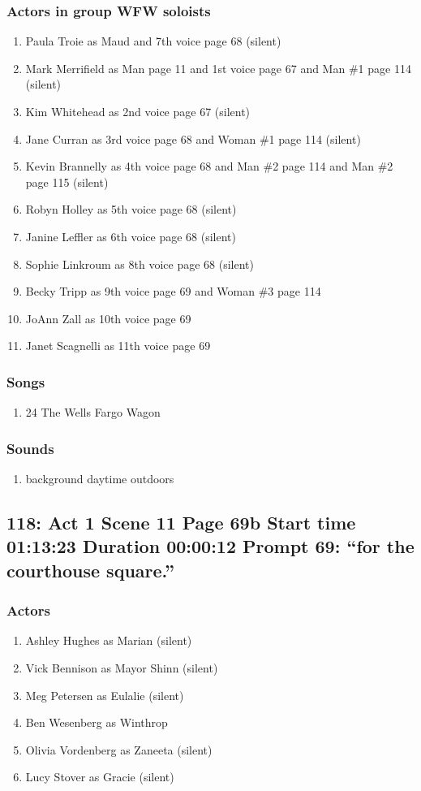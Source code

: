 \subsubsection{Actors in group WFW soloists}
\begin{enumerate}
\item Paula Troie as Maud and 7th voice page 68 (silent)
\item Mark Merrifield as Man page 11 and 1st voice page 67 and Man \#1 page 114 (silent)
\item Kim Whitehead as 2nd voice page 67 (silent)
\item Jane Curran as 3rd voice page 68 and Woman \#1 page 114 (silent)
\item Kevin Brannelly as 4th voice page 68 and Man \#2 page 114 and Man \#2 page 115 (silent)
\item Robyn Holley as 5th voice page 68 (silent)
\item Janine Leffler as 6th voice page 68 (silent)
\item Sophie Linkroum as 8th voice page 68 (silent)
\item Becky Tripp as 9th voice page 69 and Woman \#3 page 114
\item JoAnn Zall as 10th voice page 69
\item Janet Scagnelli as 11th voice page 69
\end{enumerate}

\subsubsection{Songs}
\begin{enumerate}
\item 24 The Wells Fargo Wagon
\end{enumerate}\subsubsection{Sounds}
\begin{enumerate}
\item background daytime outdoors
\end{enumerate}
\subsection{118: Act 1 Scene 11 Page 69b Start time 01:13:23 Duration 00:00:12 Prompt 69: ``for the courthouse square.''}

\subsubsection{Actors}
\begin{enumerate}
\item Ashley Hughes as Marian (silent)
\item Vick Bennison as Mayor Shinn (silent)
\item Meg Petersen as Eulalie (silent)
\item Ben Wesenberg as Winthrop
\item Olivia Vordenberg as Zaneeta (silent)
\item Lucy Stover as Gracie (silent)
\end{enumerate}
